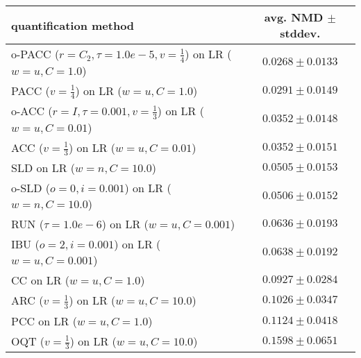 \begin{tabular}{lc}
  \toprule
  quantification method & avg. NMD $\pm$ stddev. \\
  \midrule
  o-PACC ($r=C_2, \tau=1.0e-5, v=\frac{1}{4}$) on LR ($w=u, C=1.0$) & $\mathbf{0.0268 \pm 0.0133}$ \\
  PACC ($v=\frac{1}{4}$) on LR ($w=u, C=1.0$) & $0.0291 \pm 0.0149$ \\
  o-ACC ($r=I, \tau=0.001, v=\frac{1}{3}$) on LR ($w=u, C=0.01$) & $0.0352 \pm 0.0148$ \\
  ACC ($v=\frac{1}{3}$) on LR ($w=u, C=0.01$) & $0.0352 \pm 0.0151$ \\
  SLD on LR ($w=n, C=10.0$) & $0.0505 \pm 0.0153$ \\
  o-SLD ($o=0, i=0.001$) on LR ($w=n, C=10.0$) & $0.0506 \pm 0.0152$ \\
  RUN ($\tau=1.0e-6$) on LR ($w=u, C=0.001$) & $0.0636 \pm 0.0193$ \\
  IBU ($o=2, i=0.001$) on LR ($w=u, C=0.001$) & $0.0638 \pm 0.0192$ \\
  CC on LR ($w=u, C=1.0$) & $0.0927 \pm 0.0284$ \\
  ARC ($v=\frac{1}{3}$) on LR ($w=u, C=10.0$) & $0.1026 \pm 0.0347$ \\
  PCC on LR ($w=u, C=1.0$) & $0.1124 \pm 0.0418$ \\
  OQT ($v=\frac{1}{3}$) on LR ($w=u, C=10.0$) & $0.1598 \pm 0.0651$ \\
  \bottomrule
\end{tabular}
